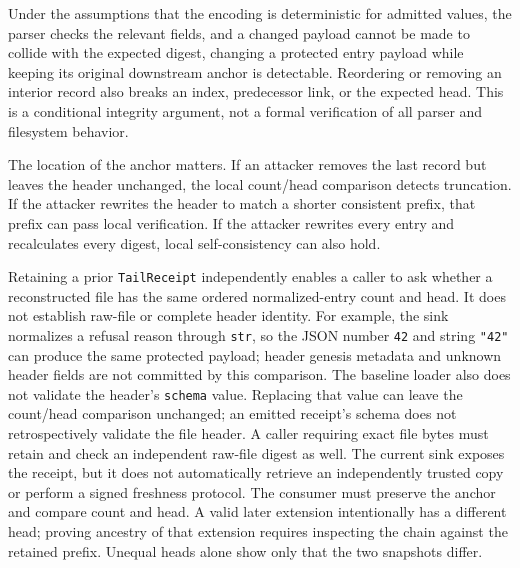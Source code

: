 \documentclass[
  11pt,
]{article}
\newcommand{\passthrough}[1]{#1}
\begin{document}
Under the assumptions that the encoding is deterministic for admitted
values, the parser checks the relevant fields, and a changed payload
cannot be made to collide with the expected digest, changing a protected
entry payload while keeping its original downstream anchor is
detectable. Reordering or removing an interior record also breaks an
index, predecessor link, or the expected head. This is a conditional
integrity argument, not a formal verification of all parser and
filesystem behavior.

The location of the anchor matters. If an attacker removes the last
record but leaves the header unchanged, the local count/head comparison
detects truncation. If the attacker rewrites the header to match a
shorter consistent prefix, that prefix can pass local verification. If
the attacker rewrites every entry and recalculates every digest, local
self-consistency can also hold.

Retaining a prior \passthrough{\lstinline!TailReceipt!} independently
enables a caller to ask whether a reconstructed file has the same
ordered normalized-entry count and head. It does not establish raw-file
or complete header identity. For example, the sink normalizes a refusal
reason through \passthrough{\lstinline!str!}, so the JSON number
\passthrough{\lstinline!42!} and string \passthrough{\lstinline!"42"!}
can produce the same protected payload; header genesis metadata and
unknown header fields are not committed by this comparison. The baseline
loader also does not validate the header's
\passthrough{\lstinline!schema!} value. Replacing that value can leave
the count/head comparison unchanged; an emitted receipt's schema does
not retrospectively validate the file header. A caller requiring exact
file bytes must retain and check an independent raw-file digest as well.
The current sink exposes the receipt, but it does not automatically
retrieve an independently trusted copy or perform a signed freshness
protocol. The consumer must preserve the anchor and compare count and
head. A valid later extension intentionally has a different head;
proving ancestry of that extension requires inspecting the chain against
the retained prefix. Unequal heads alone show only that the two
snapshots differ.
\end{document}
